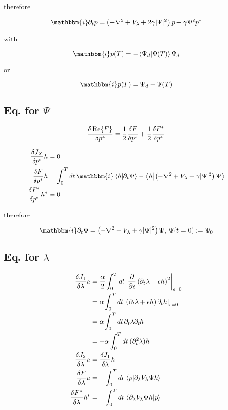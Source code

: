\documentclass[10pt,a4paper]{article}
\newcommand{\iu}{\ensuremath{\mathbbm{i}}}
\newcommand{\intT}{\ensuremath{\int_0^T dt\,}}
\begin{document}
therefore

\begin{equation}
\iu \partial_t p = \left( -\laplacian + V_{\lambda} + 2 \gamma \vert \Psi \vert^2 \right) p + \gamma \Psi^2 p^*
\end{equation}

with 

\begin{equation}
\iu p(T) = -\braket{\Psi_d}{\Psi(T)} \Psi_d
\end{equation}

or

\begin{equation}
\iu p(T) = \Psi_d - \Psi(T)
\end{equation}

\subsection{Eq. for $\Psi$}

\begin{equation}
\fdv{\Re{F}}{p^*} = \frac{1}{2} \fdv{F}{p^*} + \frac{1}{2} \fdv{F^*}{p^*}
\end{equation}

\begin{align}
\fdv{J_X}{p^*} h &= 0 \\
\fdv{F}{p^*} h &= \intT \iu \braket{h}{\partial_t\Psi} - \braket{h}{\left( -\laplacian + V_{\lambda} + \gamma \vert \Psi \vert^2 \right)\Psi} \\
\fdv{F^*}{p^*} h^* &= 0
\end{align}

therefore

\begin{equation}
\iu \partial_t\Psi = \left( -\laplacian + V_{\lambda} + \gamma \vert \Psi \vert^2 \right)\Psi, \, \Psi(t=0):=\Psi_0
\end{equation}


\subsection{Eq. for $\lambda$}

\begin{align}
\fdv{J_1}{\lambda} h &= \frac{\alpha}{2} \intT \left. \pdv{\epsilon} \left( \partial_t \lambda + \epsilon h \right)^2 \right\vert_{\epsilon=0} \\ 
&= \alpha \intT \left. \left( \partial_t \lambda + \epsilon h \right) \partial_t h \right\vert_{\epsilon=0} \\
&= \alpha \intT \partial_t \lambda \partial_t h \\ 
&= -\alpha \intT (\partial_t^2 \lambda ) h\\
\fdv{J_2}{\lambda} h &= \fdv{J_1}{\lambda} h\\
\fdv{F}{\lambda} h &= -\intT \braket{p}{\partial_{\lambda} V_{\lambda} \Psi h}  \\
\fdv{F^*}{\lambda} h^* &= -\intT \braket{\partial_{\lambda} V_{\lambda} \Psi h}{p}
\end{align}
\end{document}
